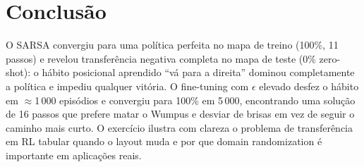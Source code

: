 \documentclass[11pt,a4paper]{article}
\begin{document}
\section{Conclus\~ao}

O SARSA convergiu para uma pol\'itica perfeita no mapa de treino (100\%, 11 passos)
e revelou transfer\^encia negativa completa no mapa de teste (0\% zero-shot): o h\'abito
posicional aprendido ``v\'a para a direita'' dominou completamente a pol\'itica e impediu
qualquer vit\'oria. O fine-tuning com $\epsilon$ elevado desfez o h\'abito em $\approx$1\,000 epis\'odios e
convergiu para 100\% em 5\,000, encontrando uma solu\c{c}\~ao de 16 passos que prefere matar
o Wumpus e desviar de brisas em vez de seguir o caminho mais curto. O exerc\'icio ilustra
com clareza o problema de transfer\^encia em RL tabular quando o layout muda e por que
domain randomization \'e importante em aplica\c{c}\~oes reais.

\bigskip
\noindent{}
\end{document}
